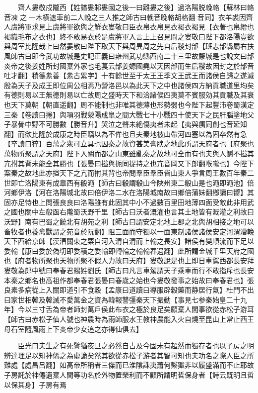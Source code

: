 　　齊人婁敬戍隴西【姓譜婁邾婁國之後一曰離婁之後】過洛陽脱輓輅【蘇林曰輅音凍之一木横遮車前二人輓之三人推之師古曰輓音晚輅胡格翻音同】衣羊裘因齊人虞將軍求見上虞將軍欲與之鮮衣婁敬曰臣衣帛衣帛見衣褐衣褐見【衣著也帛繒也褐織毛布之衣也】終不敢易衣於是虞將軍入言上上召見問之婁敬曰陛下都洛陽豈欲與周室比隆哉上曰然婁敬曰陛下取天下與周異周之先自后稷封邰【班志邰縣屬右扶風師古曰即今武功故城是史記正義曰雍州武功縣西南二十三里故漦城是也說文曰邰炎帝之後姜姓所封國棄外家也毛萇云邰姜嫄國堯以天因邰而生后稷故因封之於邰音吐才翻】積德絫善【絫古累字】十有餘世至于太王王季文王武王而諸侯自歸之遂滅殷為天子及成王即位周公相焉乃營洛邑以為此天下之中也諸侯四方納貢職道里均矣有德則易以王無德則易以亡故周之盛時天下和洽諸侯四夷莫不賓服効其貢職及其衰也天下莫朝【朝直遥翻】周不能制也非唯其德薄也形勢弱也今陛下起豐沛卷蜀漢定三秦【卷讀曰捲】與項羽戰滎陽成臯之間大戰七十小戰四十使天下之民肝腦塗地父子暴骨中野不可勝數【勝音升】哭泣之聲未絶傷夷者未起【夷與痍同創也音延知翻】而欲比隆於成康之時臣竊以為不侔也且夫秦地被山帶河四塞以為固卒然有急【卒讀曰猝】百萬之衆可立具也因秦之故資甚美膏腴之地此所謂天府者也【府聚也萬物所聚謂之天府】陛下入關而都之山東雖亂秦之故地可全而有也夫與人鬭不搤其亢拊其背未能全其勝也【張晏曰搤與扼同捉持之也亢音岡又下郎翻喉嚨也】今陛下案秦之故地此亦搤天下之亢而拊其背也帝問羣臣羣臣皆山東人爭言周王數百年秦二世即亡洛陽東有成皐西有殽澠【師古曰殽謂殽山今陜州東二殽山是也澠即澠池】倍河鄉伊洛【河在洛陽城北故曰倍伊洛二水在洛陽城南故曰鄉倍蒲妹翻鄉讀曰嚮】其固亦足恃也上問張良良曰洛陽雖有此固其中小不過數百里田地薄四面受敵此非用武之國也關中左殽函右隴蜀沃野千里【師古曰沃者溉灌也言其土地皆有溉灌之利故曰沃野】南有巴蜀之饒北有胡苑之利【師古曰謂安定北地上郡之北與胡相接之地可以畜牧者也養禽獸謂之苑音於阮翻】阻三面而守獨以一面東制諸侯諸侯安定河渭漕輓天下西給京師【漢漕關東之粟自河入渭自渭而上輸之長安】諸侯有變順流而下足以委輸【康曰委於偽切即委積之委輸即轉輪之輸輸舂遇翻】此所謂金城千里天府之國也【府者物所聚也天物所聚不假人力故曰天府】婁敬說是也上即日車駕西都長安拜婁敬為郎中號曰奉春君賜姓劉氏【師古曰凡言車駕謂天子乘車而行不敢指斥也長安本秦之鄉名也高祖作都奉春君張晏曰春歲之始也今婁敬發事之始故曰奉春君也】張良素多病從上入關即道引不食穀【孟康曰道讀曰導服辟穀藥而静居行氣】杜門不出曰家世相韓及韓滅不愛萬金之資為韓報讐彊秦天下振動【事見七参秦始皇二十九年】今以三寸舌為帝者師封萬戶侯此布衣之極於良足矣願棄人間事欲從赤松子游耳【師古曰赤松子仙人號也神農時為雨師服水王教神農能入火自燒至昆山上常止西王母石室隨風雨上下炎帝少女追之亦得仙俱去】

　　臣光曰夫生之有死譬猶夜旦之必然自古及今固未有超然而獨存者也以子房之明辨達理足以知神僊之為虛詭矣然其欲從赤松子游者其智可知也夫功名之際人臣之所難處【處昌呂翻】如高帝所稱者三傑而已淮隂誅夷蕭何繫獄非以履盛滿而不止耶故子房託於神僊遺棄人間等功名於外物置榮利而不顧所謂明哲保身者【詩云既明且哲以保其身】子房有焉


